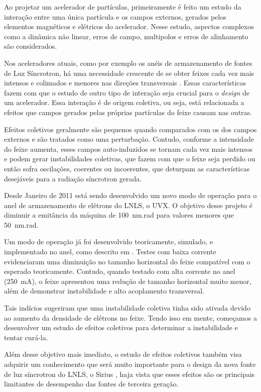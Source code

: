 Ao projetar um acelerador de partículas, primeiramente é feito um estudo da interação entre uma única partícula e os campos externos, gerados pelos elementos magnéticos e elétricos do acelerador. Nesse estudo, aspectos complexos como a dinâmica não linear, erros de campo, multipolos e erros de alinhamento são considerados.

Nos aceleradores atuais, como por exemplo os anéis de armazenamento de fontes de Luz Síncrotron, há uma necessidade crescente de se obter feixes cada vez mais intensos e colimados e menores nas direções transversais . Essas características fazem com que o estudo de outro tipo de interação seja crucial para o
\textit{design} de um acelerador. Essa interação é de origem coletiva, ou seja, está relacionada a efeitos que campos gerados pelas próprias partículas do feixe causam nas outras.

Efeitos coletivos geralmente são pequenos quando comparados com os dos campos externos e são tratados como uma perturbação. Contudo, conforme a intensidade do feixe aumenta, esses campos auto-induzidos se tornam cada vez mais intensos e podem gerar instabilidades coletivas, que fazem com que o feixe seja perdido
ou então sofra oscilações, coerentes ou incoerentes, que deturpam as características desejáveis para a radiação síncrotron gerada.

Desde Janeiro de 2011 está sendo desenvolvido um novo modo de operação para o anel de armazenamento de elétrons do LNLS, o UVX. O objetivo desse projeto é diminuir a emitância da máquina de 100~nm.rad para valores menores que 50~nm.rad.

Um modo de operação já foi desenvolvido teoricamente, simulado, e implementado no anel, como descrito em \cite{Fernando}. Testes com baixa corrente evidenciaram uma diminuição no tamanho horizontal do feixe compatível com o esperado teoricamente. Contudo, quando testado com alta corrente no anel (250~mA), o feixe apresentou uma redução de tamanho horizontal muito menor, além de demonstrar instabilidade e alto acoplamento transversal.

Tais indícios sugeriram que uma instabilidade coletiva tinha sido ativada devido ao aumento da densidade de elétrons no feixe. Tendo isso em mente, começamos a desenvolver um estudo de efeitos coletivos para determinar a instabilidade e tentar curá-la.

Além desse objetivo mais imediato, o estudo de efeitos coletivos também visa adquirir um conhecimento que será muito importante para o design da nova fonte de luz síncrotron do LNLS, o Sirius \cite{Sirius}, haja vista que esses efeitos são os principais limitantes de desempenho das fontes de terceira geração.


